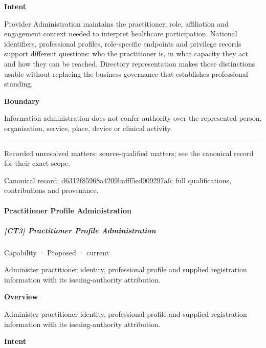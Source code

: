\textbf{Intent}



Provider Administration maintains the practitioner, role, affiliation and engagement context needed to interpret healthcare participation. National identifiers, professional profiles, role-specific endpoints and privilege records support different questions: who the practitioner is, in what capacity they act and how they can be reached. Directory representation makes those distinctions usable without replacing the business governance that establishes professional standing.



\textbf{Boundary}



Information administration does not confer authority over the represented person, organisation, service, place, device or clinical activity.



\medskip\hrule\medskip

{\small Recorded unresolved matters: source-qualified matters; see the canonical record for their exact scope.}\par
{\footnotesize \href{../../../../continuum/strategy/capability/d6312f85968a4209bafff5ed009297a6.md}{Canonical record: d6312f85968a4209bafff5ed009297a6}; full qualifications, contributions and provenance.}\par
\paragraph{Practitioner Profile Administration}

\subparagraph{[CT3] Practitioner Profile Administration}

\label{element:40759a835f7b456e9257c38b67b0a380}
{\small Capability · Proposed · current}\par

Administer practitioner identity, professional profile and supplied registration information with its issuing-authority attribution.



\textbf{Overview}



Administer practitioner identity, professional profile and supplied registration information with its issuing-authority attribution.



\textbf{Intent}



